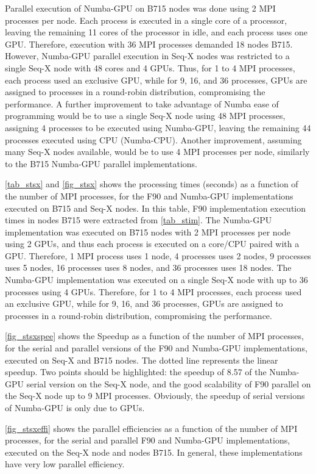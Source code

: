 Parallel execution of Numba-GPU on B715 nodes was done using 2 MPI processes per node. Each process is executed in a single core of a processor, leaving the remaining 11 cores of the processor in idle, and each process uses one GPU. 
%
Therefore, execution with 36 MPI processes demanded 18 nodes B715. However, Numba-GPU parallel execution in Seq-X nodes was restricted to a single Seq-X node with 48 cores and 4 GPUs. Thus, for 1 to 4 MPI processes, each process used an exclusive GPU, while for 9, 16, and 36 processes, GPUs are assigned to processes in a round-robin distribution, compromising the performance. A further improvement to take advantage of Numba ease of programming would be to use a single Seq-X node using 48 MPI processes, assigning 4 processes to be executed using Numba-GPU, leaving the remaining 44 processes executed using CPU (Numba-CPU). Another improvement, assuming many Seq-X nodes available, would be to use 4 MPI processes per node, similarly to the B715 Numba-GPU parallel implementations.

\autoref {tab_stsx} and \autoref {fig_stsx} shows the processing times (seconds) as a function of the number of MPI processes, for the F90 and Numba-GPU implementations executed on B715 and Seq-X nodes. In this table, F90 implementation execution times in nodes B715 were extracted from \autoref {tab_stim}. The Numba-GPU implementation was executed on B715 nodes with 2 MPI processes per node using 2 GPUs, and thus each process is executed on a core/CPU paired with a GPU. Therefore, 1 MPI process uses 1 node, 4 processes uses 2 nodes, 9 processes uses 5 nodes, 16 processes uses 8 nodes, and 36 processes uses 18 nodes. The Numba-GPU implementation was executed on a single Seq-X node with up to 36 processes using 4 GPUs. Therefore, for 1 to 4 MPI processes, each process used an exclusive GPU, while for 9, 16, and 36 processes, GPUs are assigned to processes in a round-robin distribution, compromising the performance.

\autoref {fig_stsxspee} shows the Speedup as a function of the number of MPI processes, for the serial and parallel versions of the F90 and Numba-GPU implementations, executed on Seq-X and B715 nodes. The dotted line represents the linear speedup. Two points should be highlighted: the speedup of 8.57 of the Numba-GPU serial version on the Seq-X node, and the good scalability of F90 parallel on the Seq-X node up to 9 MPI processes. Obviously, the speedup of serial versions of Numba-GPU is only due to GPUs.

\autoref {fig_stsxeffi} shows the parallel efficiencies as a function of the number of MPI processes, for the serial and parallel F90 and Numba-GPU implementations, executed on the Seq-X node and nodes B715. In general, these implementations have very low parallel efficiency.

